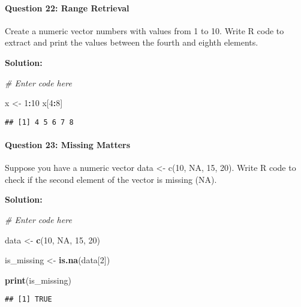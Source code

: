 \documentclass[
]{article}
\newenvironment{Shaded}{\begin{snugshade}}{\end{snugshade}}
\newcommand{\CommentTok}[1]{\textcolor[rgb]{0.56,0.35,0.01}{\textit{#1}}}
\newcommand{\ConstantTok}[1]{\textcolor[rgb]{0.56,0.35,0.01}{#1}}
\newcommand{\DecValTok}[1]{\textcolor[rgb]{0.00,0.00,0.81}{#1}}
\newcommand{\FunctionTok}[1]{\textcolor[rgb]{0.13,0.29,0.53}{\textbf{#1}}}
\newcommand{\NormalTok}[1]{#1}
\newcommand{\OtherTok}[1]{\textcolor[rgb]{0.56,0.35,0.01}{#1}}
\newcommand{\SpecialCharTok}[1]{\textcolor[rgb]{0.81,0.36,0.00}{\textbf{#1}}}
\begin{document}
\hypertarget{question-22-range-retrieval}{%
\paragraph{Question 22: Range
Retrieval}\label{question-22-range-retrieval}}

Create a numeric vector numbers with values from 1 to 10. Write R code
to extract and print the values between the fourth and eighth elements.

\textbf{Solution:}

\begin{Shaded}
\begin{Highlighting}[]
\CommentTok{\# Enter code here}

\NormalTok{x }\OtherTok{\textless{}{-}} \DecValTok{1}\SpecialCharTok{:}\DecValTok{10}
\NormalTok{x[}\DecValTok{4}\SpecialCharTok{:}\DecValTok{8}\NormalTok{]}
\end{Highlighting}
\end{Shaded}

\begin{verbatim}
## [1] 4 5 6 7 8
\end{verbatim}

\hypertarget{question-23-missing-matters}{%
\paragraph{Question 23: Missing
Matters}\label{question-23-missing-matters}}

Suppose you have a numeric vector data \textless- c(10, NA, 15, 20).
Write R code to check if the second element of the vector is missing
(NA).

\textbf{Solution:}

\begin{Shaded}
\begin{Highlighting}[]
\CommentTok{\# Enter code here}

\NormalTok{data }\OtherTok{\textless{}{-}} \FunctionTok{c}\NormalTok{(}\DecValTok{10}\NormalTok{, }\ConstantTok{NA}\NormalTok{, }\DecValTok{15}\NormalTok{, }\DecValTok{20}\NormalTok{)}

\NormalTok{is\_missing }\OtherTok{\textless{}{-}} \FunctionTok{is.na}\NormalTok{(data[}\DecValTok{2}\NormalTok{])}

\FunctionTok{print}\NormalTok{(is\_missing)}
\end{Highlighting}
\end{Shaded}

\begin{verbatim}
## [1] TRUE
\end{verbatim}
\end{document}
